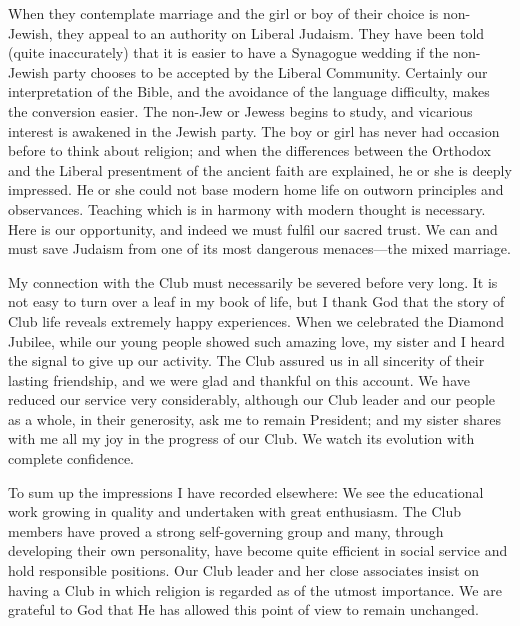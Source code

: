 When they contemplate marriage and the girl or boy
of their choice is non-Jewish, they appeal to an authority
on Liberal Judaism. They have been told (quite
inaccurately) that it is easier to have a Synagogue
wedding if the non-Jewish party chooses to be accepted
by the Liberal Community. Certainly our interpretation
of the Bible, and the avoidance of the language difficulty,
makes the conversion easier. The non-Jew or Jewess
begins to study, and vicarious interest is awakened in the
Jewish party. The boy or girl has never had occasion
before to think about religion; and when the differences
between the Orthodox and the Liberal presentment of
the ancient faith are explained, he or she is deeply
impressed. He or she could not base modern home life
on outworn principles and observances. Teaching which
is in harmony with modern thought is necessary.
Here is our opportunity, and indeed we must fulfil
our sacred trust. We can and must save Judaism
from one of its most dangerous menaces—the mixed
marriage.

My connection with the Club must necessarily be
severed before very long. It is not easy to turn over a
leaf in my book of life, but I thank God that the story
of Club life reveals extremely happy experiences. When
we celebrated the Diamond Jubilee, while our young
people showed such amazing love, my sister and I heard
the signal to give up our activity. The Club assured us
in all sincerity of their lasting friendship, and we were
glad and thankful on this account. We have reduced our
service very considerably, although our Club leader and
our people as a whole, in their generosity, ask me to
remain President; and my sister shares with me all my
joy in the progress of our Club. We watch its evolution
with complete confidence.

To sum up the impressions I have recorded elsewhere:
We see the educational work growing in quality and
undertaken with great enthusiasm. The Club members
have proved a strong self-governing group and many,
through developing their own personality, have become
quite efficient in social service and hold responsible positions.
Our Club leader and her close associates insist on
having a Club in which religion is regarded as of the
utmost importance. We are grateful to God that He has
allowed this point of view to remain unchanged.

